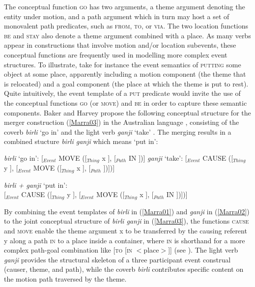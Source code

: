\smallskip
{\scriptsize
\begin{avm}
\end{avm}
}

\bigskip
The conceptual function \textsc{go} has two arguments, a theme argument denoting the entity under motion, and a path argument which in turn may host a set of monovalent path predicates, such as \textsc{from}, \textsc{to}, or \textsc{via}. The two location functions \textsc{be} and \textsc{stay} also denote a theme argument combined with a place. As many verbs appear in constructions that involve motion and/or location subevents, these conceptual functions are frequently used in modelling more complex event structures. To illustrate, take for instance the event semantics of \textsc{putting} some object at some place, apparently including a motion component (the theme that is relocated) and a goal component (the place at which the theme is put to rest). Quite intuitively, the event template of a \textsc{put} predicate would invite the use of the conceptual functions \textsc{go} (or \textsc{move}) and \textsc{be} in order to capture these semantic components. Baker and Harvey propose the following conceptual structure for the merger construction (\ref{Marra03}) in the Australian language , consisting of the coverb \textit{birli} `go in' and the light verb \textit{ganji} `take' \citep[24f.]{baker2010complex}. The merging results in a combined stucture \textit{birli ganji} which means `put in':

\ea \label{Marra01}
\textit{birli} `go in': {\small[$_{Event}$ MOVE ([$_{Thing}$ x ], [$_{Path}$ IN ])]}
\z
\ea \label{Marra02}
\textit{ganji} `take': {\small[$_{Event}$ CAUSE ([$_{Thing}$ y ], [$_{Event}$ MOVE ([$_{Thing}$ x ], [$_{Path}$ ])])]}
\z

\ea \label{Marra03}
\textit{birli + ganji} `put in': \\
{\small[$_{Event}$ CAUSE ([$_{Thing}$ y ], [$_{Event}$ MOVE ([$_{Thing}$ x ], [$_{Path}$ IN ])])]}
\z

By combining the event templates of \textit{birli} in (\ref{Marra01}) and \textit{ganji} in (\ref{Marra02}) to the joint conceptual structure of \textit{birli ganji} in (\ref{Marra03}), the functions \textsc{cause} and \textsc{move} enable the theme argument x to be transferred by the causing referent y along a path \textsc{in} to a place inside a container, where \textsc{in} is shorthand for a more complex path-goal combination like [\textsc{to} [\textsc{in} $<$place$>$]] (see \citealt[45]{Jackendoff1990}). The light verb \textit{ganji} provides the structural skeleton of a three participant event construal (causer, theme, and path), while the coverb \textit{birli} contributes specific content on the motion path traversed by the theme. 

